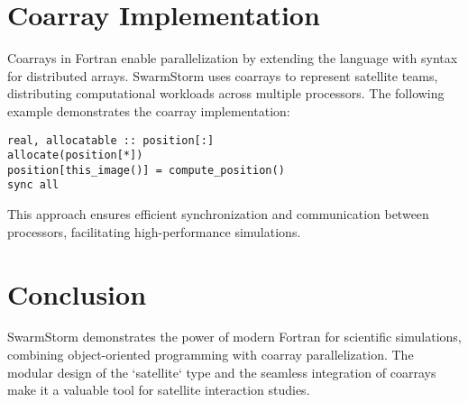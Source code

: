\documentclass[10pt, oneside]{article}
\begin{document}


\section{Coarray Implementation}
Coarrays in Fortran enable parallelization by extending the language with syntax for distributed arrays. SwarmStorm uses coarrays to represent satellite teams, distributing computational workloads across multiple processors. The following example demonstrates the coarray implementation:

\begin{lstlisting}
real, allocatable :: position[:]
allocate(position[*])
position[this_image()] = compute_position()
sync all
\end{lstlisting}

This approach ensures efficient synchronization and communication between processors, facilitating high-performance simulations.

\section{Conclusion}
SwarmStorm demonstrates the power of modern Fortran for scientific simulations, combining object-oriented programming with coarray parallelization. The modular design of the `satellite` type and the seamless integration of coarrays make it a valuable tool for satellite interaction studies.

\newpage
\printbibliography
\end{document}
